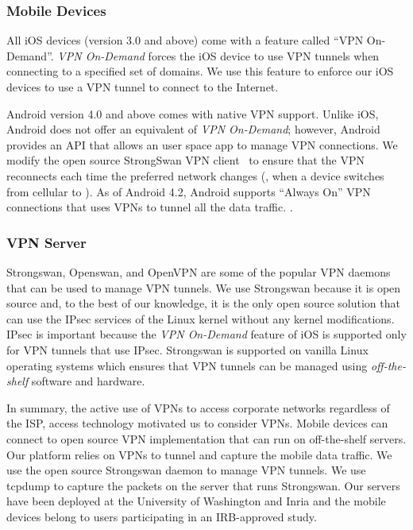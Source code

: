 \subsubsection{Mobile Devices}

All iOS devices (version 3.0 and above) come with a feature called ``VPN
On-Demand''. \emph{VPN On-Demand} forces the iOS device to use VPN tunnels
when connecting to a specified set of domains. We use this feature to
enforce our iOS devices to use a VPN tunnel to connect to the Internet.

Android version 4.0 and above comes with native VPN support. Unlike iOS,
Android does not offer an equivalent of \emph{VPN On-Demand}; however,
Android provides an API that allows an user space app to manage VPN
connections. We modify the open source StrongSwan VPN
client~\cite{strongswanclient} to ensure that the VPN reconnects each time
the preferred network changes (\eg, when a device switches from cellular to
\wifi). As of Android 4.2, Android supports ``Always On'' VPN connections
that uses VPNs to tunnel all the data traffic. .

\subsubsection{VPN Server}
Strongswan, Openswan, and OpenVPN are some of the popular VPN daemons that
can be used to manage VPN tunnels. We use Strongswan because it
is open source and, to the best of our knowledge, it is the only open
source solution that can use the IPsec services of the Linux kernel without
any kernel modifications. IPsec is important because the \emph{VPN
On-Demand} feature of iOS is supported only for VPN tunnels that use IPsec.
Strongswan is supported on vanilla Linux operating systems which ensures
that VPN tunnels can be managed using \emph{off-the-shelf} software and
hardware.

In summary, the active use of VPNs to access corporate networks regardless of the ISP, access technology motivated us to consider VPNs. Mobile devices can connect to open source VPN implementation that can run on off-the-shelf servers.
Our platform relies on VPNs to tunnel and capture the mobile data traffic.
We use the open source Strongswan daemon to manage VPN tunnels. We use
tcpdump to capture the packets on the server that runs Strongswan. Our servers have been deployed at the University of Washington and Inria and the mobile devices belong to users participating in an IRB-approved study. 

